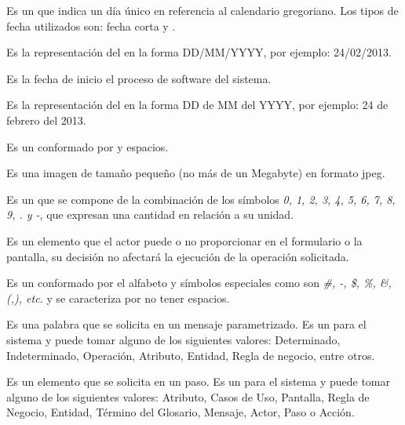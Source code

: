 \begin{description}
	 Es un  que indica un día único en referencia al calendario gregoriano. Los tipos de fecha utilizados son: 
	{fecha corta} y . %

	 Es la representación del   en la forma DD/MM/YYYY, por ejemplo: 24/02/2013.
	
	 Es la fecha de inicio el proceso de software del sistema.

	 Es la representación del   en la forma DD de MM del YYYY, por ejemplo: 24 de febrero del 2013.

	 Es un  conformado por  y espacios.
	
	 Es una imagen de tamaño pequeño (no más de un Megabyte) en formato jpeg.
	
	 Es un  que se compone de la combinación de los símbolos \textit{0, 1, 2, 3, 4, 5, 6, 7, 8, 9, . y -},  que expresan una cantidad 
	en relación a su unidad.
	
	 Es un elemento que el actor puede o no proporcionar en el formulario o la pantalla, su decisión no afectará la ejecución de la operación solicitada.

	 Es un   conformado por el alfabeto y símbolos especiales como son 
	\textit{\#, -, \$, \%, \&, (,), etc.} y se caracteriza por no tener espacios.
	
	 Es una palabra que se solicita en un mensaje parametrizado. Es un  para el sistema y puede tomar alguno de los siguientes valores:
	Determinado, Indeterminado, Operación, Atributo, Entidad, Regla de negocio, entre otros.
	
	 Es un elemento que se solicita en un paso. Es un  para el sistema y puede tomar alguno de los siguientes valores:
	Atributo, Casos de Uso, Pantalla, Regla de Negocio, Entidad, Término del Glosario, Mensaje, Actor, Paso o Acción.
	

\end{description}
